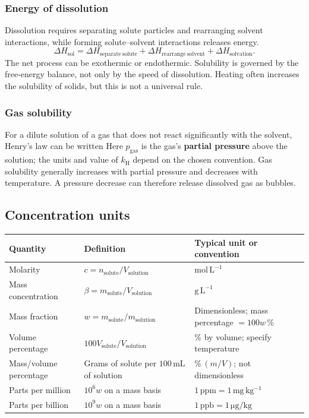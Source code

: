 \documentclass[a4paper,10pt]{article}
\newcommand{\chemunit}[1]{\,\mathrm{#1}}
\begin{document}
\subsubsection{Energy of dissolution}
Dissolution requires separating solute particles and rearranging solvent
interactions, while forming solute--solvent interactions releases energy.
\[
 \Delta H_{\mathrm{sol}}=
 \Delta H_{\mathrm{separate\ solute}}+
 \Delta H_{\mathrm{rearrange\ solvent}}+
 \Delta H_{\mathrm{solvation}}.
\]
The net process can be exothermic or endothermic. Solubility is governed by the
free-energy balance, not only by the speed of dissolution. Heating often increases
the solubility of solids, but this is not a universal rule.

\subsubsection{Gas solubility}
For a dilute solution of a gas that does not react significantly with the solvent,
Henry's law can be written
Here $p_{\mathrm{gas}}$ is the gas's \textbf{partial pressure} above the solution;
the units and value of $k_{\mathrm H}$ depend on the chosen convention.
Gas solubility generally increases with partial pressure and decreases with
temperature. A pressure decrease can therefore release dissolved gas as bubbles.

\subsection{Concentration units}
\label{sec:concentration}

\begin{tabularx}{\linewidth}{@{}P{34mm}P{64mm}L@{}}
\toprule
Quantity & Definition & Typical unit or convention \\
\midrule
Molarity & $c=n_{\mathrm{solute}}/V_{\mathrm{solution}}$ & $\mathrm{mol\,L^{-1}}$ \\
Mass concentration & $\beta=m_{\mathrm{solute}}/V_{\mathrm{solution}}$ & $\mathrm{g\,L^{-1}}$ \\
Mass fraction & $w=m_{\mathrm{solute}}/m_{\mathrm{solution}}$ & Dimensionless; mass percentage $=100w\,\%$ \\
Volume percentage & $100V_{\mathrm{solute}}/V_{\mathrm{solution}}$ & $\%$ by volume; specify temperature \\
Mass/volume percentage & Grams of solute per $100\chemunit{mL}$ of solution & $\%\,(m/V)$; not dimensionless \\
Parts per million & $10^6w$ on a mass basis & $1\chemunit{ppm}=1\chemunit{mg\,kg^{-1}}$ \\
Parts per billion & $10^9w$ on a mass basis & $1\chemunit{ppb}=1\,\si{\micro\gram\per\kilogram}$ \\
\bottomrule
\end{tabularx}
\end{document}
